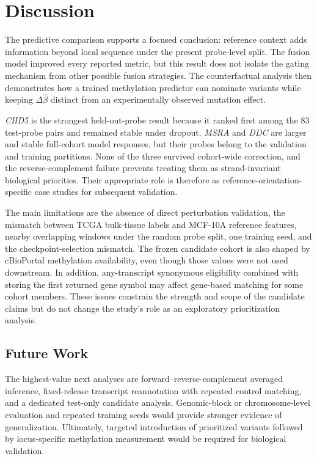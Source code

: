 \documentclass[10pt,letterpaper,twocolumn]{article}
\begin{document}
\section{Discussion}

The predictive comparison supports a focused conclusion: reference
context adds information beyond local sequence under the present
probe-level split. The fusion model improved every reported metric, but
this result does not isolate the gating mechanism from other possible
fusion strategies. The counterfactual analysis then demonstrates how a
trained methylation predictor can nominate variants while keeping
$\Delta\hat\beta$ distinct from an experimentally observed mutation
effect.

\textit{CHD5} is the strongest held-out-probe result because it ranked
first among the 83 test-probe pairs and remained stable under dropout.
\textit{MSRA} and \textit{DDC} are larger and stable full-cohort model
responses, but their probes belong to the validation and training
partitions. None of the three survived cohort-wide correction, and the
reverse-complement failure prevents treating them as strand-invariant
biological priorities. Their appropriate role is therefore as
reference-orientation-specific case studies for subsequent validation.

The main limitations are the absence of direct perturbation validation,
the mismatch between TCGA bulk-tissue labels and MCF-10A reference
features, nearby overlapping windows under the random probe split, one
training seed, and the checkpoint-selection mismatch. The frozen
candidate cohort is also shaped by cBioPortal methylation availability,
even though those values were not used downstream. In addition,
any-transcript synonymous eligibility combined with storing the first
returned gene symbol may affect gene-based matching for some cohort
members. These issues constrain the strength and scope of the candidate
claims but do not change the study's role as an exploratory
prioritization analysis.

\subsection{Future Work}

The highest-value next analyses are forward--reverse-complement averaged
inference, fixed-release transcript reannotation with repeated control
matching, and a dedicated test-only candidate analysis. Genomic-block
or chromosome-level evaluation and repeated training seeds would
provide stronger evidence of generalization. Ultimately, targeted
introduction of prioritized variants followed by locus-specific
methylation measurement would be required for biological validation.
\end{document}
